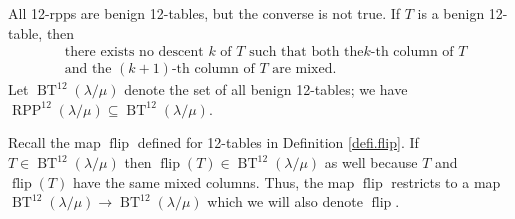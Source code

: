 \documentclass[numbers=enddot,12pt,final,onecolumn,notitlepage]{scrartcl}%
\theoremstyle{definition}
\def\OneTwoRPP{{\operatorname{RPP}^{12}\left(  \lambda/\mu\right)}}
\def\BenignTables{{\operatorname{BT}^{12}\left(  \lambda/\mu\right)}}
\def\flip{{\operatorname{flip}}}
\begin{document}

All 12-rpps are benign 12-tables, but the converse is not true. If $T$ is a benign 12-table, then%
\begin{align}
&  \text{there exists no descent }k\text{ of }T\text{ such that both the
}k\text{-th column of }T\nonumber\\
&  \text{and the }\left(  k+1\right)  \text{-th column of }T\text{ are mixed.}
\label{eq.benign.not-both-mixed}%
\end{align}
Let $\BenignTables$ denote the set of all benign 12-tables; we have $\OneTwoRPP\subseteq\BenignTables$.

Recall the map $\flip$ defined for 12-tables in Definition \ref{defi.flip}. If $T\in\BenignTables$ then $\flip(T)\in\BenignTables$ as well because $T$ and $\flip(T)$ have the same mixed columns. Thus, the map $\flip$ restricts to a map $\BenignTables\to\BenignTables$ which we will also denote $\flip$. 
\end{document}
